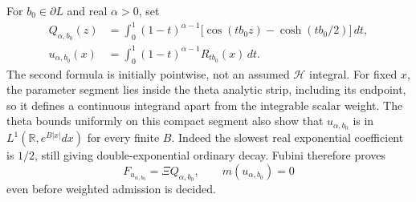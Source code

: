 \documentclass[11pt,a4paper]{article}
\numberwithin{equation}{section}
\theoremstyle{definition}
\theoremstyle{remark}
\newcommand{\R}{\mathbb R}
\newcommand{\Hh}{\mathcal H}
\begin{document}
For $b_0\in\partial L$ and real $\alpha>0$, set
\begin{align}
 Q_{\alpha,b_0}(z)
 &=\int_0^1(1-t)^{\alpha-1}
       \bigl[\cos(tb_0z)-\cosh(tb_0/2)\bigr]\,dt,\label{eq:boundary-quotient}\\
 u_{\alpha,b_0}(x)
 &=\int_0^1(1-t)^{\alpha-1}R_{tb_0}(x)\,dt.\label{eq:boundary-source}
\end{align}
The second formula is initially pointwise, not an assumed $\Hh$ integral. For fixed $x$, the parameter segment lies inside the theta analytic strip, including its endpoint, so it defines a continuous integrand apart from the integrable scalar weight. The theta bounds uniformly on this compact segment also show that $u_{\alpha,b_0}$ is in $L^1(\R,e^{B|x|}dx)$ for every finite $B$. Indeed the slowest real exponential coefficient is $1/2$, still giving double-exponential ordinary decay. Fubini therefore proves
\begin{equation}\label{eq:boundary-transform}
 F_{u_{\alpha,b_0}}=\Xi Q_{\alpha,b_0},\qquad m(u_{\alpha,b_0})=0
\end{equation}
even before weighted admission is decided.
\end{document}
